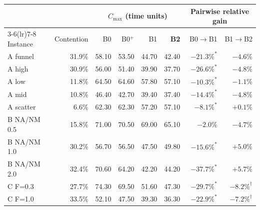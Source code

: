 \begin{tabular}{@{}lrrrrrrr@{}}
\toprule
& & \multicolumn{4}{c}{$C_{\max}$ (time units)} & \multicolumn{2}{c}{Pairwise relative gain} \\
\cmidrule(lr){3-6}\cmidrule(lr){7-8}
Instance & Contention & B0 & B0$^{+}$ & B1 & \textbf{B2} & B0$\rightarrow$B1 & B1$\rightarrow$B2 \\
\midrule
A funnel & 31.9\% & 58.10 & 53.50 & 44.70 & 42.40 & $-21.3\%^{*}$ & $-4.6\%$ \\
A high & 30.9\% & 56.00 & 51.40 & 39.90 & 37.70 & $-26.6\%^{*}$ & $-4.8\%$ \\
A low & 11.8\% & 64.50 & 64.60 & 57.80 & 57.10 & $-10.3\%^{*}$ & $-1.1\%$ \\
A mid & 10.8\% & 46.40 & 42.70 & 39.40 & 37.40 & $-14.4\%^{*}$ & $-4.8\%$ \\
A scatter & 6.6\% & 62.30 & 62.30 & 57.20 & 57.10 & $-8.1\%^{*}$ & $+0.1\%$ \\
\midrule
B NA/NM 0.5 & 15.8\% & 71.00 & 70.50 & 69.00 & 65.10 & $-2.0\%$ & $-4.7\%$ \\
B NA/NM 1.0 & 30.2\% & 56.70 & 56.50 & 47.50 & 49.80 & $-15.6\%^{*}$ & $+5.0\%$ \\
B NA/NM 2.0 & 32.4\% & 70.60 & 64.20 & 42.20 & 44.20 & $-37.7\%^{*}$ & $+5.7\%$ \\
\midrule
C F=0.3 & 27.7\% & 74.30 & 69.50 & 51.60 & 47.30 & $-29.7\%^{*}$ & $-8.2\%^{\dagger}$ \\
C F=1.0 & 33.5\% & 52.10 & 47.50 & 39.30 & 36.30 & $-22.9\%^{*}$ & $-7.2\%^{\dagger}$ \\
\bottomrule
\end{tabular}
